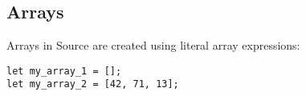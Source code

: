 \subsection*{Arrays}

Arrays in Source are created using literal array expressions:
\begin{lstlisting}
let my_array_1 = [];
let my_array_2 = [42, 71, 13];
\end{lstlisting}
